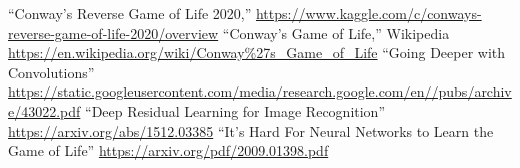 \documentclass[conference]{IEEEtran}
\begin{document}
\begin{thebibliography}{00}         
 ``Conway's Reverse Game of Life 2020,'' \url{https://www.kaggle.com/c/conways-reverse-game-of-life-2020/overview}
 ``Conway's Game of Life,'' Wikipedia \url{https://en.wikipedia.org/wiki/Conway\%27s_Game_of_Life}
 ``Going Deeper with Convolutions'' \url{https://static.googleusercontent.com/media/research.google.com/en//pubs/archive/43022.pdf}
 ``Deep Residual Learning for Image Recognition''
\url{https://arxiv.org/abs/1512.03385}
 ``It’s Hard For Neural Networks to Learn the Game of
Life''
\url{https://arxiv.org/pdf/2009.01398.pdf}
\end{thebibliography}
\end{document}
